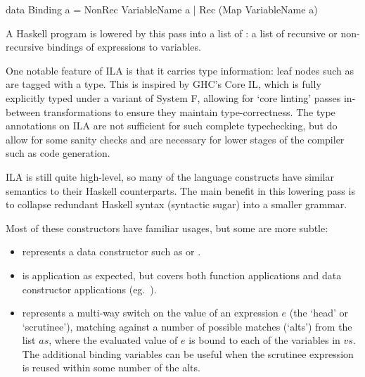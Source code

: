 \documentclass[dissertation.tex]{subfiles}
\begin{document}
{{{\begin{haskellfigure}
            data Binding a = NonRec VariableName a
                            | Rec (Map VariableName a)
            \end{haskellfigure}

            A Haskell program is lowered by this pass into a list of : a list of recursive or
            non-recursive bindings of expressions to variables.

            One notable feature of ILA is that it carries type information: leaf nodes such as  are
            tagged with a type. This is inspired by GHC's Core IL, which is fully explicitly typed under a variant
            of System F, allowing for `core linting' passes in-between transformations to ensure they maintain
            type-correctness. The type annotations on ILA are not sufficient for such complete typechecking, but do
            allow for some sanity checks and are necessary for lower stages of the compiler such as code generation.

            ILA is still quite high-level, so many of the language constructs have similar semantics to their
            Haskell counterparts. The main benefit in this lowering pass is to collapse redundant Haskell syntax
            (syntactic sugar) into a smaller grammar.


            Most of these constructors have familiar usages, but some are more subtle:

            \begin{itemize}
            \item {} represents a data constructor such as  or .
            \item
            {

                 is application as expected, but covers both function applications and data
                constructor applications (eg.\ ).


            }
            \item
            {

                 represents a multi-way switch on the value of an expression \(e\)
                (the `head' or `scrutinee'), matching against a number of possible matches (`alts') from the list
                \(as\), where the evaluated value of \(e\) is bound to each of the variables in \(vs\). The
                additional binding variables can be useful when the scrutinee expression is reused within some
                number of the alts.

}
\end{itemize}}}}
\end{document}
